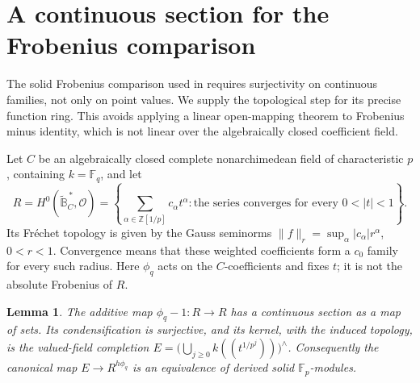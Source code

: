 \documentclass[11pt]{article}
\numberwithin{equation}{section}
\newtheorem{lemma}[theorem]{Lemma}
\theoremstyle{definition}
\theoremstyle{remark}
\begin{document}
\section{A continuous section for the Frobenius comparison}
\label{app:frobenius}

The solid Frobenius comparison used in
 requires surjectivity on continuous
families, not only on point values.  We supply the topological step for
its precise function ring.  This avoids applying a linear open-mapping
theorem to Frobenius minus identity, which is not linear over the
algebraically closed coefficient field.

Let $C$ be an algebraically closed complete nonarchimedean field of
characteristic $p$, containing $k=\mathbb F_q$, and let
\[
 R=H^0(\widetilde{\mathbb B}^{\,*}_C,\mathcal O)
   =\left\{\sum_{\alpha\in\mathbb Z[1/p]}c_\alpha t^\alpha:
                 \text{the series converges for every }0<|t|<1\right\}.
\]
Its Fr\'echet topology is given by the Gauss seminorms
$\|f\|_r=\sup_\alpha |c_\alpha|r^\alpha$, $0<r<1$.
Convergence means that these weighted coefficients form a $c_0$ family
for every such radius.  Here $\phi_q$ acts on the $C$-coefficients
and fixes $t$; it is not the absolute Frobenius of $R$.

\begin{lemma}\label{lem:continuous-as-section}
The additive map $\phi_q-1:R\to R$ has a continuous section as a map
of sets.  Its condensification is surjective, and its kernel, with the
induced topology, is the valued-field completion
$E=\bigl(\bigcup_{j\ge0}k((t^{1/p^j}))\bigr)^{\wedge}$.
Consequently the canonical map $E\to R^{h\phi_q}$ is an equivalence
of derived solid $\mathbb F_p$-modules.
\end{lemma}
\end{document}
